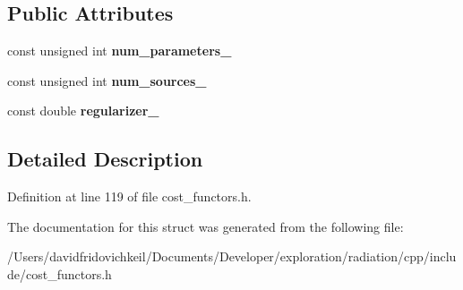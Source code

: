 \subsection*{Public Attributes}
\begin{DoxyCompactItemize}
\item 
\hypertarget{structradiation_1_1_belief_regularization_aca8f44de0a47d50a25a79084bb871d82}{}\label{structradiation_1_1_belief_regularization_aca8f44de0a47d50a25a79084bb871d82} 
const unsigned int {\bfseries num\+\_\+parameters\+\_\+}
\item 
\hypertarget{structradiation_1_1_belief_regularization_ae3ae44194d0a343720ae0a2469949dca}{}\label{structradiation_1_1_belief_regularization_ae3ae44194d0a343720ae0a2469949dca} 
const unsigned int {\bfseries num\+\_\+sources\+\_\+}
\item 
\hypertarget{structradiation_1_1_belief_regularization_a791c0ddeda2af95d559ed3c4b11b6abb}{}\label{structradiation_1_1_belief_regularization_a791c0ddeda2af95d559ed3c4b11b6abb} 
const double {\bfseries regularizer\+\_\+}
\end{DoxyCompactItemize}


\subsection{Detailed Description}


Definition at line 119 of file cost\+\_\+functors.\+h.



The documentation for this struct was generated from the following file\+:\begin{DoxyCompactItemize}
\item 
/\+Users/davidfridovichkeil/\+Documents/\+Developer/exploration/radiation/cpp/include/cost\+\_\+functors.\+h\end{DoxyCompactItemize}
